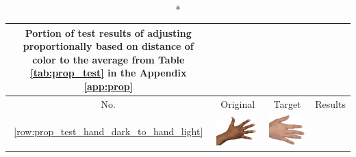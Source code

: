 \documentclass[12pt, a4paper]{article}
\begin{document}
\begin{longtable}{|c||c|c|c|}
    \caption*{Portion of test results of adjusting proportionally based on distance of color to the average from Table \ref{tab:prop_test} in the Appendix \ref{app:prop}}\\
    \hline
    No. & Original & Target & Results \\
    \hline  \ref{row:prop_test_hand_dark_to_hand_light} &
  \begin{minipage}{.29\textwidth}
    \includegraphics[width=\textwidth,height=\textheight,keepaspectratio]{../inputs/hand_dark.jpg}
  \end{minipage} & 
  \begin{minipage}{.29\textwidth}
    \includegraphics[width=\textwidth,height=\textheight,keepaspectratio]{../inputs/hand_light.jpg}

\end{minipage}
\end{longtable}
\end{document}
